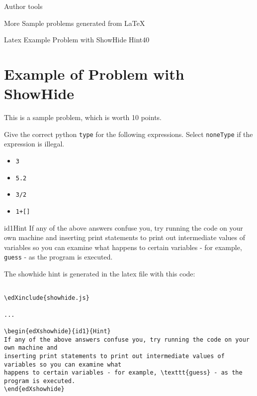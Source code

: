 \documentclass[12pt]{article}
\begin{document}
\begin{edXchapter}{Author tools}

\begin{edXsection}{More Sample problems generated from LaTeX}

\begin{edXsequential}

\begin{edXproblem}{Latex Example Problem with ShowHide Hint}{40}


\section{Example of Problem with ShowHide}  

This is a sample problem, which is worth 10 points.

Give the correct python {\tt type} for the following expressions.  Select {\tt noneType} if the expression is illegal.

\begin{itemize}
\item {\tt 3}   
\item {\tt 5.2} 
\item {\tt 3/2} 
\item {\tt 1+[]} 
\end{itemize}

\begin{edXshowhide}{id1}{Hint}
If any of the above answers confuse you, try running the code on your own machine and 
inserting print statements to print out intermediate values of variables so you can examine what 
happens to certain variables - for example, \texttt{guess} - as the program is executed.
\end{edXshowhide}

The showhide hint is generated in the latex file with this code:
\begin{verbatim}

\edXinclude{showhide.js}

...

\begin{edXshowhide}{id1}{Hint}
If any of the above answers confuse you, try running the code on your own machine and 
inserting print statements to print out intermediate values of variables so you can examine what 
happens to certain variables - for example, \texttt{guess} - as the program is executed.
\end{edXshowhide}


\end{verbatim}
\end{edXproblem}
\end{edXsequential}
\end{edXsection}
\end{edXchapter}
\end{document}
